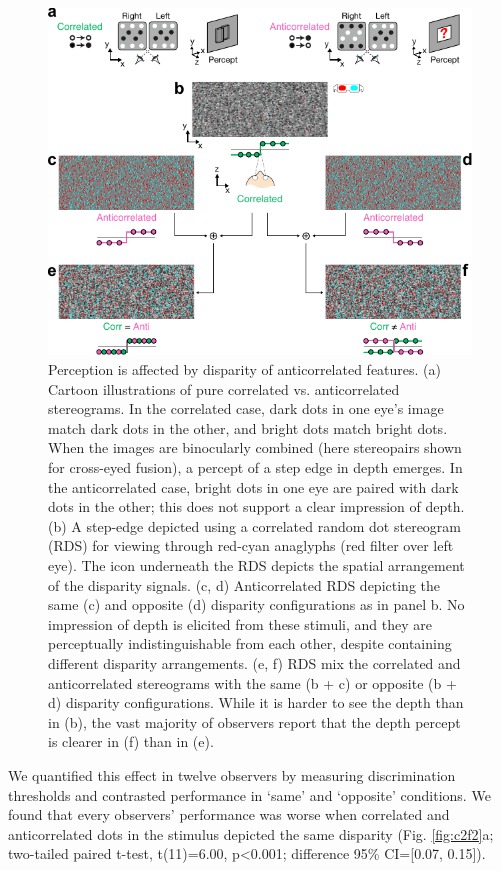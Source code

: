 \begin{figure}
  \centering
  \includegraphics{Fig1}
  \caption[Perception is affected by disparity of anticorrelated features.]{Perception is affected by disparity of anticorrelated features. (a) Cartoon illustrations of pure correlated vs. anticorrelated stereograms. In the correlated case, dark dots in one eye's image match dark dots in the other, and bright dots match bright dots. When the images are binocularly combined (here stereopairs shown for cross-eyed fusion), a percept of a step edge in depth emerges. In the anticorrelated case, bright dots in one eye are paired with dark dots in the other; this does not support a clear impression of depth. (b) A step-edge depicted using a correlated random dot stereogram (RDS) for viewing through red-cyan anaglyphs (red filter over left eye). The icon underneath the RDS depicts the spatial arrangement of the disparity signals. (c, d) Anticorrelated RDS depicting the same (c) and opposite (d) disparity configurations as in panel b. No impression of depth is elicited from these stimuli, and they are perceptually indistinguishable from each other, despite containing different disparity arrangements. (e, f) RDS mix the correlated and anticorrelated stereograms with the same (b + c) or opposite (b + d) disparity configurations. While it is harder to see the depth than in (b), the vast majority of observers report that the depth percept is clearer in (f) than in (e).}
  \label{fig:c2f1}
\end{figure}


We quantified this effect in twelve observers by measuring discrimination thresholds and contrasted performance in `same' and `opposite' conditions. We found that every observers' performance was worse when correlated and anticorrelated dots in the stimulus depicted the same disparity (Fig. \ref{fig:c2f2}a; two-tailed paired t-test, t(11)=6.00, p<0.001; difference 95\% CI=[0.07, 0.15]). 

